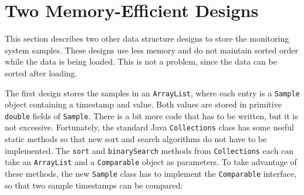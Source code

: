 \section{Two Memory-Efficient Designs}
\label{sec:better-designs} 

This section describes two other data structure designs to store the monitoring system samples. These designs use less memory and do not maintain sorted order while the data is being loaded. This is not a problem, since the data can be sorted after loading. 

The first design stores the samples in an \texttt{ArrayList}, where each entry is a \texttt{Sample} object containing a timestamp and value. Both values are stored in primitive \texttt{double} fields of \texttt{Sample}.  There is a bit more code that has to be written, but it is not excessive. Fortunately, the standard Java \texttt{Collections} class has some useful static methods so that new sort and search algorithms do not have to be implemented. The \texttt{sort} and \texttt{binarySearch} methods from \texttt{Collections} each can take an \texttt{ArrayList} and a \texttt{Comparable} object as parameters. To take advantage of these methods, the new \texttt{Sample} class has to implement the \texttt{Comparable} interface, so that two sample timestamps can be compared:  

